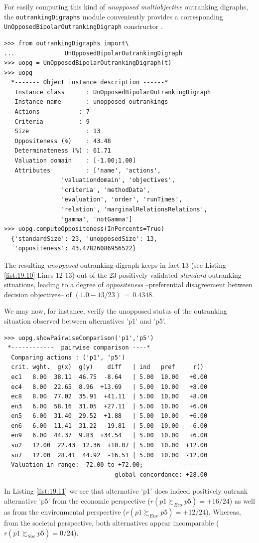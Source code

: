 For easily computing this kind of \emph{unopposed multiobjective} outranking digraphs, the \texttt{outrankingDigraphs} module conveniently provides a corresponding \texttt{UnOpposedBipolarOutrankingDigraph} constructor .
\begin{lstlisting}[caption={Unopposed outranking digraph constructor},label=list:19.10]
>>> from outrankingDigraphs import\
...              UnOpposedBipolarOutrankingDigraph
>>> uopg = UnOpposedBipolarOutrankingDigraph(t)
>>> uopg
  *------- Object instance description ------*
   Instance class      : UnOpposedBipolarOutrankingDigraph
   Instance name       : unopposed_outrankings
   Actions           : 7
   Criteria          : 9
   Size                : 13
   Oppositeness (%)    : 43.48
   Determinateness (%) : 61.71
   Valuation domain    : [-1.00;1.00]
   Attributes          : ['name', 'actions',
                'valuationdomain', 'objectives',
                'criteria', 'methodData',
                'evaluation', 'order', 'runTimes',
                'relation', 'marginalRelationsRelations',
                'gamma', 'notGamma']
>>> uopg.computeOppositeness(InPercents=True)
  {'standardSize': 23, 'unopposedSize': 13,
   'oppositeness': 43.47826086956522}			   
\end{lstlisting}
The resulting \emph{unopposed} outranking digraph keeps in fact 13 (see Listing \ref{list:19.10} Lines 12-13) out of the 23 positively validated \emph{standard} outranking situations, leading to a degree of \emph{oppositeness} --preferential disagreement between decision objectives-- of $(1.0 - 13/23)\,=\,0.4348$.

We may now, for instance, verify the unopposed status of the outranking situation observed between alternatives 'p1' and 'p5'.
\begin{lstlisting}[caption={Example of unopposed multiobjective outranking situation},label=list:19.11]
>>> uopg.showPairwiseComparison('p1','p5')
 *------------  pairwise comparison ----*
  Comparing actions : ('p1', 'p5')
  crit. wght.  g(x)  g(y)    diff   | ind   pref     r()
  ec1   8.00  38.11  46.75  -8.64   | 5.00  10.00   +0.00
  ec4   8.00  22.65  8.96  +13.69   | 5.00  10.00   +8.00
  ec8   8.00  77.02  35.91  +41.11  | 5.00  10.00   +8.00
  en3   6.00  58.16  31.05  +27.11  | 5.00  10.00   +6.00
  en5   6.00  31.40  29.52  +1.88   | 5.00  10.00   +6.00
  en6   6.00  11.41  31.22  -19.81  | 5.00  10.00   -6.00
  en9   6.00  44.37  9.83  +34.54   | 5.00  10.00   +6.00
  so2   12.00  22.43  12.36  +10.07 | 5.00  10.00  +12.00
  so7   12.00  28.41  44.92  -16.51 | 5.00  10.00  -12.00
  Valuation in range: -72.00 to +72.00;           -------
                               global concordance: +28.00
\end{lstlisting}
In Listing \ref{list:19.11} we see that alternative 'p1' does indeed positively outrank alternative 'p5' from the economic perspective ($r(p1 \succsim_{Eco} p5) = +16/24$) as well as from the environmental perspective ($r(p1 \succsim_{Env} p5) = +12/24$). Whereas, from the societal perspective, both alternatives appear incomparable ($r(p1 \succsim_{Soc} p5) = 0/24$).


